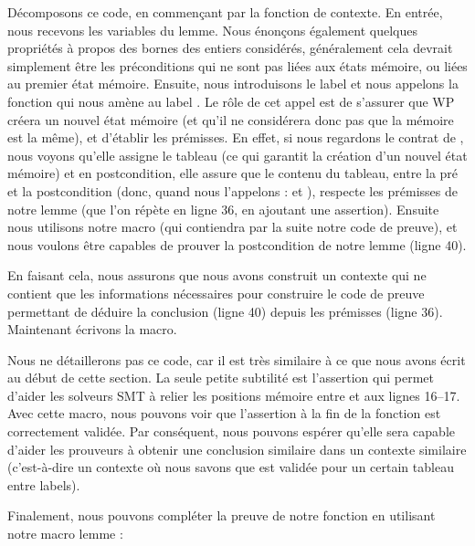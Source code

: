 Décomposons ce code, en commençant par la fonction de contexte. En entrée, nous
recevons les variables du lemme. Nous énonçons également quelques propriétés à
propos des bornes des entiers considérés, généralement cela devrait simplement
être les préconditions qui ne sont pas liées aux états mémoire, ou liées au
premier état mémoire. Ensuite, nous introduisons le label  et nous
appelons la fonction  qui nous amène au label
. Le rôle de cet appel est de s'assurer que WP créera un nouvel
état mémoire (et qu'il ne considérera donc pas que la mémoire est la même), et
d'établir les prémisses. En effet, si nous regardons le contrat de
, nous voyons qu'elle assigne le tableau (ce qui
garantit la création d'un nouvel état mémoire) et en postcondition, elle assure
que le contenu du tableau, entre la pré et la postcondition (donc, quand nous
l'appelons :  et ), respecte les prémisses de notre
lemme (que l'on répète en ligne 36, en ajoutant une assertion). Ensuite nous
utilisons notre macro  (qui contiendra par la suite notre
code de preuve), et nous voulons être capables de prouver la postcondition de
notre lemme (ligne 40).


En faisant cela, nous assurons que nous avons construit un contexte qui ne
contient que les informations nécessaires pour construire le code de preuve
permettant de déduire la conclusion (ligne 40) depuis les prémisses (ligne 36).
Maintenant écrivons la macro.




Nous ne détaillerons pas ce code, car il est très similaire à ce que nous avons
écrit au début de cette section. La seule petite subtilité est l'assertion qui
permet d'aider les solveurs SMT à relier les positions mémoire entre
 et  aux lignes 16--17. Avec cette macro, nous
pouvons voir que l'assertion à la fin de la fonction
 est correctement validée. Par
conséquent, nous pouvons espérer qu'elle sera capable d'aider les prouveurs à
obtenir une conclusion similaire dans un contexte similaire (c'est-à-dire un
contexte où nous savons que  est validée pour un certain
tableau entre labels).


Finalement, nous pouvons compléter la preuve de notre fonction 
en utilisant notre macro lemme :




